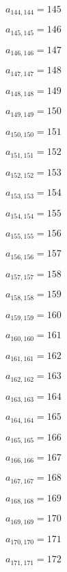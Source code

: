 \documentclass[a4paper,12pt]{article}
\begin{document}
$a _{ 144, 144 } = 145$

$a _{ 145, 145 } = 146$

$a _{ 146, 146 } = 147$

$a _{ 147, 147 } = 148$

$a _{ 148, 148 } = 149$

$a _{ 149, 149 } = 150$

$a _{ 150, 150 } = 151$

$a _{ 151, 151 } = 152$

$a _{ 152, 152 } = 153$

$a _{ 153, 153 } = 154$

$a _{ 154, 154 } = 155$

$a _{ 155, 155 } = 156$

$a _{ 156, 156 } = 157$

$a _{ 157, 157 } = 158$

$a _{ 158, 158 } = 159$

$a _{ 159, 159 } = 160$

$a _{ 160, 160 } = 161$

$a _{ 161, 161 } = 162$

$a _{ 162, 162 } = 163$

$a _{ 163, 163 } = 164$

$a _{ 164, 164 } = 165$

$a _{ 165, 165 } = 166$

$a _{ 166, 166 } = 167$

$a _{ 167, 167 } = 168$

$a _{ 168, 168 } = 169$

$a _{ 169, 169 } = 170$

$a _{ 170, 170 } = 171$

$a _{ 171, 171 } = 172$
\end{document}
